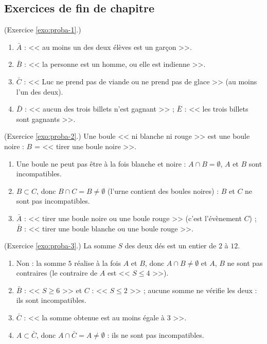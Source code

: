 \begin{corrige}
\subsection*{Exercices de fin de chapitre}
\begin{sol} (Exercice \ref{exo:proba-1}.)
\begin{enumerate}
\item $\bar{A}$ : << au moins un des deux \'el\`eves est un gar\c{c}on >>.
\item $\bar{B}$ : << la personne est un homme, ou elle est indienne >>.
\item $\bar{C}$ : << Luc ne prend pas de viande ou ne prend pas de glace >> (au moins l'un des deux).
\item $\bar{D}$ : << aucun des trois billets n'est gagnant >> ; $\bar{E}$ : << les trois billets sont gagnants >>.
\end{enumerate}
\end{sol}
%
\begin{sol} (Exercice \ref{exo:proba-2}.)
Une boule << ni blanche ni rouge >> est une boule noire : $B$ = << tirer une boule noire >>.
\begin{enumerate}
\item Une boule ne peut pas \^etre \`a la fois blanche et noire : $A\cap B = \emptyset$, $A$ et $B$ sont incompatibles.
\item $B \subset C$, donc $B\cap C = B \neq \emptyset$ (l'urne contient des boules noires) : $B$ et $C$ ne sont pas incompatibles.
\item $\bar{A}$ : << tirer une boule noire ou une boule rouge >> (c'est l'\'ev\`enement $C$) ;
      $\bar{B}$ : << tirer une boule blanche ou une boule rouge >>.
\end{enumerate}
\end{sol}
%
\begin{sol} (Exercice \ref{exo:proba-3}.)
La somme $S$ des deux d\'es est un entier de $2$ \`a $12$.
\begin{enumerate}
\item Non : la somme $5$ r\'ealise \`a la fois $A$ et $B$, donc $A\cap B \neq \emptyset$ et $A$, $B$ ne sont pas contraires
      (le contraire de $A$ est << $S \leq 4$ >>).
\item $\bar{B}$ : << $S \geq 6$ >> et $C$ : << $S \leq 2$ >> ; aucune somme ne v\'erifie les deux : ils sont incompatibles.
\item $\bar{C}$ : << la somme obtenue est au moins \'egale \`a $3$ >>.
\item $A \subset \bar{C}$, donc $A \cap \bar{C} = A \neq \emptyset$ : ils ne sont pas incompatibles.

\end{enumerate}
\end{sol}
\end{corrige}
